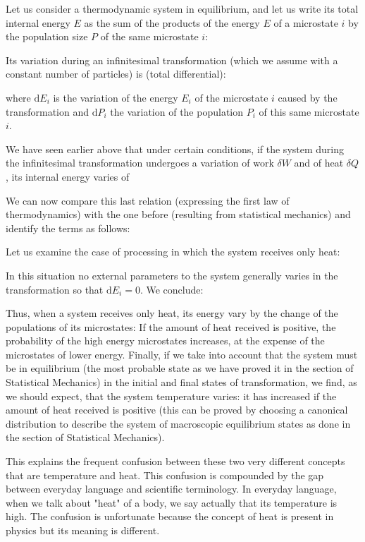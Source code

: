 	Let us consider a thermodynamic system in equilibrium, and let us write its total internal energy $E$ as the sum of the products of the energy $E$ of a microstate $i$ by the population size $P$ of the same microstate $i$:
	
	Its variation during an infinitesimal transformation (which we assume with a constant number of particles) is (total differential):
	
	where $\mathrm{d}E_i$ is the variation of the energy $E_i$ of the microstate $i$ caused by the transformation and $\mathrm{d}P_i$ the variation of the population $P_i$ of this same microstate $i$.

	We have seen earlier above that under certain conditions, if the system during the infinitesimal transformation undergoes a variation of work $\delta W$ and of heat $\delta Q$, its internal energy varies of
	
	We can now compare this last relation (expressing the first law of thermodynamics) with the one before (resulting from statistical mechanics) and identify the terms as follows:
	
	Let us examine the case of processing in which the system receives only heat:
	
	In this situation no external parameters to the system generally varies in the transformation so that $\mathrm{d}E_i=0$. We conclude:
	
	Thus, when a system receives only heat, its energy vary by the change of the populations of its microstates: If the amount of heat received is positive, the probability of the high energy microstates increases, at the expense of the microstates of lower energy. Finally, if we take into account that the system must be in equilibrium (the most probable state as we have proved it in the section of Statistical Mechanics) in the initial and final states of transformation, we find, as we should expect, that the system temperature varies: it has increased if the amount of heat received is positive (this can be proved by choosing a canonical distribution to describe the system of macroscopic equilibrium states as done in the section of Statistical Mechanics).

	This explains the frequent confusion between these two very different concepts that are temperature and heat. This confusion is compounded by the gap between everyday language and scientific terminology. In everyday language, when we talk about "heat" of a body, we say actually that its temperature is high. The confusion is unfortunate because the concept of heat is present in physics but its meaning is different.

